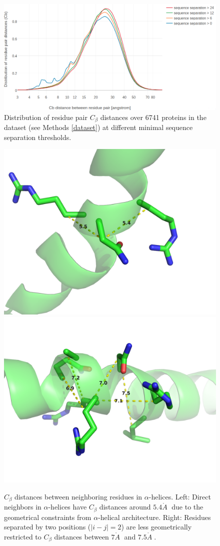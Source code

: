 \documentclass[11pt,a4paper,twoside]{book}
\newcommand{\Cb}{C_\beta}
\newcommand{\angstrom}{\mathring{A} \;}
\theoremstyle{definition}
\theoremstyle{definition}
\theoremstyle{remark}
\begin{document}
\begin{figure}

{\centering \includegraphics[width=1\linewidth]{img/dataset_statistics/Cb_distribution_all_data43579541_log} 

}

\caption{Distribution of residue pair \(\Cb\)
distances over 6741 proteins in the dataset (see Methods \ref{dataset})
at different minimal sequence separation thresholds.}\label{fig:Cb-distribution}
\end{figure}









\begin{figure}

{\centering \includegraphics[width=0.4\linewidth]{img/dataset_statistics/cb_distribution_peak_5-6} \includegraphics[width=0.4\linewidth]{img/dataset_statistics/cb_distribution_peak_7} 

}

\caption{\(\Cb\) distances between
neighboring residues in \(\alpha\)-helices. Left: Direct neighbors in
\(\alpha\)-helices have \(\Cb\) distances around \(5.4\angstrom\) due to
the geometrical constraints from \(\alpha\)-helical architecture. Right:
Residues separated by two positions (\(|i-j| = 2\)) are less
geometrically restricted to \(\Cb\) distances between \(7\angstrom\) and
\(7.5\angstrom\).}\label{fig:peaks-Cb-distribution}
\end{figure}
\end{document}
